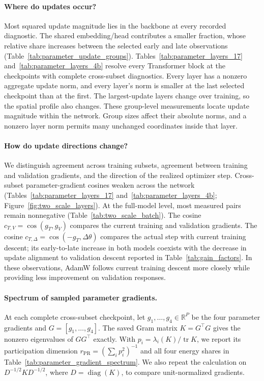 \paragraph{Where do updates occur?}
Most squared update magnitude lies in the backbone at every recorded diagnostic. The shared embedding/head contributes a smaller fraction, whose relative share increases between the selected early and late observations (Table~\ref{tab:parameter_update_groups}). Tables~\ref{tab:parameter_layers_17} and~\ref{tab:parameter_layers_4b} resolve every Transformer block at the checkpoints with complete cross-subset diagnostics. Every layer has a nonzero aggregate update norm, and every layer's norm is smaller at the last selected checkpoint than at the first. The largest-update layers change over training, so the spatial profile also changes. These group-level measurements locate update magnitude within the network. Group sizes affect their absolute norms, and a nonzero layer norm permits many unchanged coordinates inside that layer.

\paragraph{How do update directions change?}
We distinguish agreement across training subsets, agreement between training and validation gradients, and the direction of the realized optimizer step. Cross-subset parameter-gradient cosines weaken across the network (Tables~\ref{tab:parameter_layers_17} and~\ref{tab:parameter_layers_4b}; Figure~\ref{fig:two_scale_layers}). At the full-model level, most measured pairs remain nonnegative (Table~\ref{tab:two_scale_batch}). The cosine $c_{T,V}=\cos(g_T,g_V)$ compares the current training and validation gradients. The cosine $c_{T,\Delta}=\cos(-g_T,\Delta\theta)$ compares the actual step with current training descent; its early-to-late increase in both models coexists with the decrease in update alignment to validation descent reported in Table~\ref{tab:gain_factors}. In these observations, AdamW follows current training descent more closely while providing less improvement on validation responses.





\FloatBarrier
\paragraph{Spectrum of sampled parameter gradients.}
At each complete cross-subset checkpoint, let $g_1,\ldots,g_4\in\mathbb R^P$ be the four parameter gradients and $G=[g_1,\ldots,g_4]$. The saved Gram matrix $K=G^\top G$ gives the nonzero eigenvalues of $GG^\top$ exactly. With $p_i=\lambda_i(K)/\operatorname{tr}K$, we report its participation dimension $r_{\mathrm{PR}}=(\sum_i p_i^2)^{-1}$ and all four energy shares in Table~\ref{tab:parameter_gradient_spectrum}. We also repeat the calculation on $D^{-1/2}KD^{-1/2}$, where $D=\operatorname{diag}(K)$, to compare unit-normalized gradients.

